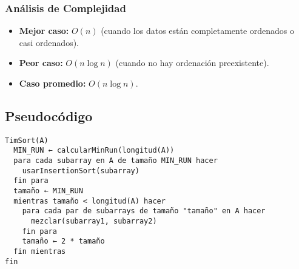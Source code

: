 \documentclass[11pt,openany]{book}
\begin{document}
\subsubsection{Análisis de Complejidad}
\begin{itemize}
    \item \textbf{Mejor caso:} $O(n)$ (cuando los datos están completamente ordenados o casi ordenados).
    \item \textbf{Peor caso:} $O(n \log n)$ (cuando no hay ordenación preexistente).
    \item \textbf{Caso promedio:} $O(n \log n)$.
\end{itemize}

\subsection{Pseudocódigo}
\begin{verbatim}
TimSort(A)
  MIN_RUN ← calcularMinRun(longitud(A))
  para cada subarray en A de tamaño MIN_RUN hacer
    usarInsertionSort(subarray)
  fin para
  tamaño ← MIN_RUN
  mientras tamaño < longitud(A) hacer
    para cada par de subarrays de tamaño "tamaño" en A hacer
      mezclar(subarray1, subarray2)
    fin para
    tamaño ← 2 * tamaño
  fin mientras
fin
\end{verbatim}
\end{document}
